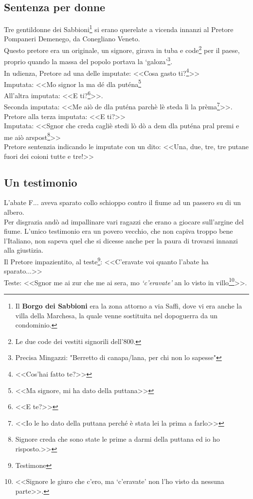 \subsection{Sentenza per donne}
Tre gentildonne dei Sabbioni\footnote{Il \textbf{Borgo dei Sabbioni} era la zona attorno a via Saffi, dove vi era anche la villa della Marchesa, la quale venne sostituita nel dopoguerra da un condominio.} si erano querelate a vicenda innanzi al Pretore Pompaneri Demenego, da Conegliano Veneto.\\
\indent Questo pretore era un originale, un signore, girava in tuba e code\footnote{Le due code dei vestiti signorili dell'800.} per il paese, proprio quando la massa del popolo portava la `galoza'\footnote{Precisa Mingazzi: "Berretto di canapa/lana, per chi non lo sapesse"}.\\
\indent In udienza, Pretore ad una delle imputate: <<Cosa gasto ti?\footnote{<<Cos'hai fatto te?>>}>>\\
\indent Imputata: <<Mo signor la ma dé dla puténa\footnote{<<Ma signore, mi ha dato della puttana>>}\\
\indent All'altra imputata: <<E ti?\footnote{<<E te?>>}>>.\\
\indent Seconda imputata: <<Me aiò de dla puténa parchè lè steda lì la prèma\footnote{<<Io le ho dato della puttana perché è stata lei la prima a farlo>>}>>.\\
\indent Pretore alla terza imputata: <<E ti?>>\\
\indent Imputata: <<Sgnor che creda cagliè stedi lò dò a dem dla puténa pral premi e me aiò arspost\footnote{Signore creda che sono state le prime a darmi della puttana ed io ho risposto.>>}>>\\
\indent Pretore sentenzia indicando le imputate con un dito: <<Una, due, tre, tre putane fuori dei coioni tutte e tre!>>

\subsection{Un testimonio}
L'abate F\:.\:.\:. aveva sparato collo schioppo contro il fiume ad un passero su di un albero.\\
\indent Per disgrazia andò ad impallinare vari ragazzi che erano a giocare sull'argine del fiume. L'unico testimonio era un povero vecchio, che non capiva troppo bene l'Italiano, non sapeva quel che si dicesse anche per la paura di trovarsi innanzi alla giustizia.	\\
\indent Il Pretore impazientito, al teste\footnote{Testimone}: <<C'eravate voi quanto l'abate ha sparato...>>\\
\indent Teste: <<Sgnor me ai zur che me ai sera, mo \emph{`c'eravate'} an lo visto in villo\footnote{<<Signore le giuro che c'ero, ma `c'eravate' non l'ho visto da nessuna parte>>.}>>.


